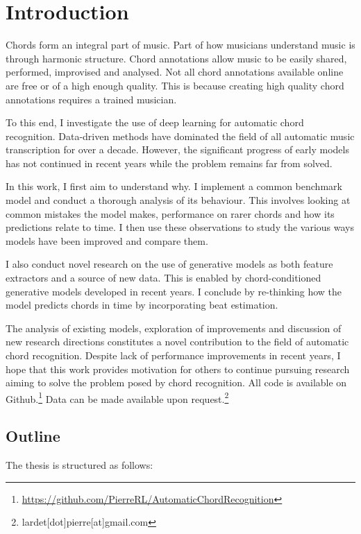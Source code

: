\chapter{Introduction}

Chords form an integral part of music. Part of how musicians understand music is through harmonic structure. Chord annotations allow music to be easily shared, performed, improvised and analysed. Not all chord annotations available online are free or of a high enough quality. This is because creating high quality chord annotations requires a trained musician. 

To this end, I investigate the use of deep learning for automatic chord recognition. Data-driven methods have dominated the field of all automatic music transcription for over a decade. However, the significant progress of early models has not continued in recent years while the problem remains far from solved.

In this work, I first aim to understand why. I implement a common benchmark model and conduct a thorough analysis of its behaviour. This involves looking at common mistakes the model makes, performance on rarer chords and how its predictions relate to time. I then use these observations to study the various ways models have been improved and compare them. 

I also conduct novel research on the use of generative models as both feature extractors and a source of new data. This is enabled by chord-conditioned generative models developed in recent years. I conclude by re-thinking how the model predicts chords in time by incorporating beat estimation. 

The analysis of existing models, exploration of improvements and discussion of new research directions constitutes a novel contribution to the field of automatic chord recognition. Despite lack of performance improvements in recent years, I hope that this work provides motivation for others to continue pursuing research aiming to solve the problem posed by chord recognition. All code is available on Github.\footnote{\url{https://github.com/PierreRL/AutomaticChordRecognition}} Data can be made available upon request.\footnote{lardet[dot]pierre[at]gmail.com}

\section{Outline}

The thesis is structured as follows:

